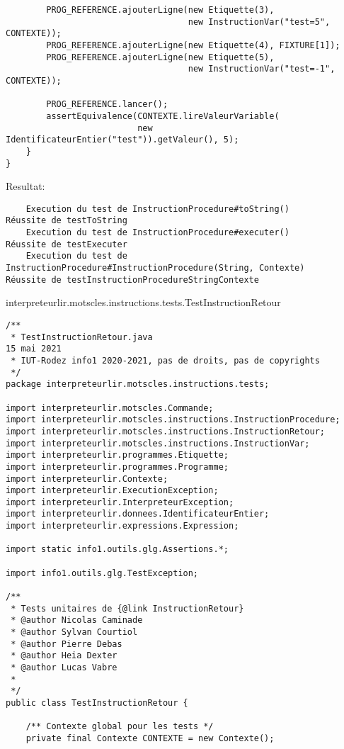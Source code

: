 \begin{enum}
\begin{verbatim}
        PROG_REFERENCE.ajouterLigne(new Etiquette(3),
                                    new InstructionVar("test=5", CONTEXTE));
        PROG_REFERENCE.ajouterLigne(new Etiquette(4), FIXTURE[1]);
        PROG_REFERENCE.ajouterLigne(new Etiquette(5),
                                    new InstructionVar("test=-1", CONTEXTE));
        
        PROG_REFERENCE.lancer();
        assertEquivalence(CONTEXTE.lireValeurVariable(
                          new IdentificateurEntier("test")).getValeur(), 5);
    }
}
\end{verbatim}
Resultat:
\begin{verbatim}
    Execution du test de InstructionProcedure#toString()
Réussite de testToString
    Execution du test de InstructionProcedure#executer()
Réussite de testExecuter
    Execution du test de InstructionProcedure#InstructionProcedure(String, Contexte)
Réussite de testInstructionProcedureStringContexte
\end{verbatim}

    \item interpreteurlir.motscles.instructions.tests.TestInstructionRetour
\begin{verbatim}
/**
 * TestInstructionRetour.java                                        15 mai 2021
 * IUT-Rodez info1 2020-2021, pas de droits, pas de copyrights
 */
package interpreteurlir.motscles.instructions.tests;

import interpreteurlir.motscles.Commande;
import interpreteurlir.motscles.instructions.InstructionProcedure;
import interpreteurlir.motscles.instructions.InstructionRetour;
import interpreteurlir.motscles.instructions.InstructionVar;
import interpreteurlir.programmes.Etiquette;
import interpreteurlir.programmes.Programme;
import interpreteurlir.Contexte;
import interpreteurlir.ExecutionException;
import interpreteurlir.InterpreteurException;
import interpreteurlir.donnees.IdentificateurEntier;
import interpreteurlir.expressions.Expression;

import static info1.outils.glg.Assertions.*;

import info1.outils.glg.TestException;

/**
 * Tests unitaires de {@link InstructionRetour}
 * @author Nicolas Caminade
 * @author Sylvan Courtiol
 * @author Pierre Debas
 * @author Heia Dexter
 * @author Lucas Vabre
 *
 */
public class TestInstructionRetour {
    
    /** Contexte global pour les tests */
    private final Contexte CONTEXTE = new Contexte();
    

\end{verbatim}
\end{enum}
